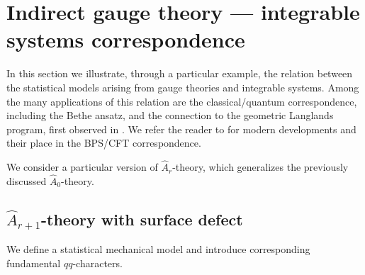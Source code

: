 \documentclass[12pt]{article}
\numberwithin{equation}{section}
\theoremstyle{definition}
\begin{document}
\section{Indirect gauge theory --- integrable systems correspondence}

 
In this section we illustrate, through a particular example, the relation between the statistical models arising from gauge theories and integrable systems. Among the many applications of this relation are the classical/quantum correspondence, including the Bethe ansatz, and the connection to the geometric Langlands program, first observed in \cite{Feigin:1994in}.
 We refer the reader to \cite{Etingof:2023drx, Jeong:2023qdr, Jeong:2024hwf} for modern developments and their place in the BPS/CFT correspondence. 
 


We consider a particular version of $\hat{A}_{r}$-theory, 
which generalizes the previously discussed $\hat{A}_{0}$-theory.

\subsection{$\hat{A}_{r+1}$-theory with surface defect}
We define a statistical mechanical model and introduce corresponding fundamental $qq$-characters.
\end{document}
